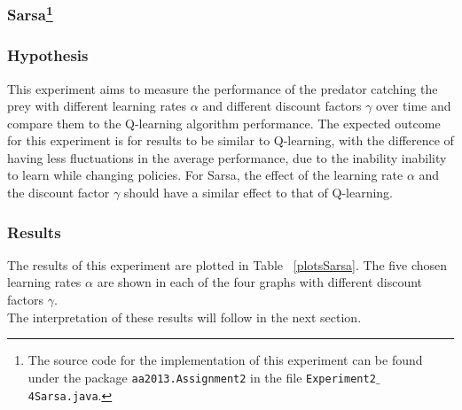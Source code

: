 \documentclass[11pt]{article}
\begin{document}





\subsubsection[title]{Sarsa\footnote{The source code for the implementation of this experiment can be found under the package \texttt{aa2013.Assignment2} in the file \texttt{Experiment2$\_$4Sarsa.java}.}}



\subsubsection{Hypothesis}
This experiment aims to measure the performance of the predator catching the prey with different learning rates $\alpha$ and different discount factors $\gamma$ over time and compare them to the Q-learning algorithm performance. The expected outcome for this experiment is for results to be similar to Q-learning, with the difference of having less fluctuations in the average performance, due to the inability inability to learn while changing policies. For Sarsa, the effect of the learning rate $\alpha$ and the discount factor $\gamma$ should have a similar effect to that of Q-learning.


\subsubsection{Results}
The results of this experiment are plotted in Table ~\ref{plotsSarsa}. The five chosen learning rates $\alpha$ are shown in each of the four graphs with different discount factors $\gamma$.\\
The interpretation of these results will follow in the next section.
\end{document}
